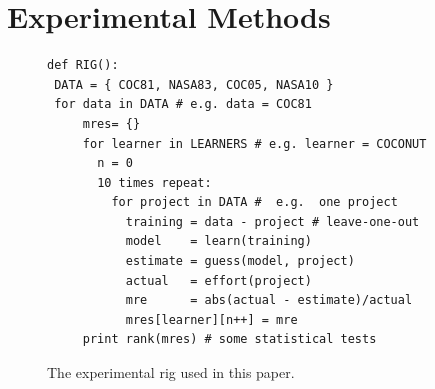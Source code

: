 \documentclass{sig-alternate}
\begin{document}




\section{Experimental Methods} 







\begin{figure}[!t]
\begin{lstlisting}
def RIG():
 DATA = { COC81, NASA83, COC05, NASA10 }
 for data in DATA # e.g. data = COC81
     mres= {}
     for learner in LEARNERS # e.g. learner = COCONUT
       n = 0
       10 times repeat: 
         for project in DATA #  e.g.  one project
           training = data - project # leave-one-out
           model    = learn(training)
           estimate = guess(model, project)
           actual   = effort(project)
           mre      = abs(actual - estimate)/actual
           mres[learner][n++] = mre
     print rank(mres) # some statistical tests
\end{lstlisting}
\caption{The experimental rig used in this paper.}\label{fig:rig}
\end{figure}
\end{document}
